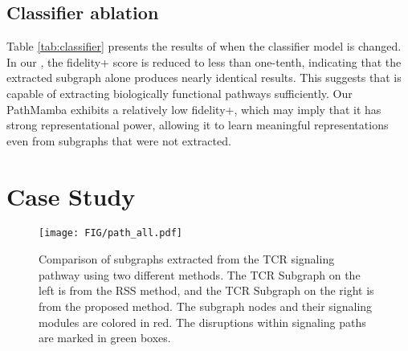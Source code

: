 \subsection{Classifier ablation}
\begin{table}[t]
\centering
 \caption{\explainer fidelity score comparison with other classifier models. }
\end{table}
Table \ref{tab:classifier} presents the results of \explainer when the classifier model is changed. In our \classifier, the fidelity+ score is reduced to less than one-tenth, indicating that the extracted subgraph alone produces nearly identical results. 
This suggests that \method is capable of extracting biologically functional pathways sufficiently. 
Our PathMamba exhibits a relatively low fidelity+, which may imply that it has strong representational power, allowing it to learn meaningful representations even from subgraphs that were not extracted.

\section{Case Study}\label{app:casestudy}
\begin{figure*}
\centering
\texttt{[image: FIG/path\_all.pdf]}
\caption{Comparison of subgraphs extracted from the TCR signaling pathway using two different methods. The TCR Subgraph on the left is from the RSS method, and the TCR Subgraph on the right is from the proposed method. The subgraph nodes and their signaling modules are colored in red. The disruptions within signaling paths are marked in green boxes.}
\label{fig:path_all}
\end{figure*}

